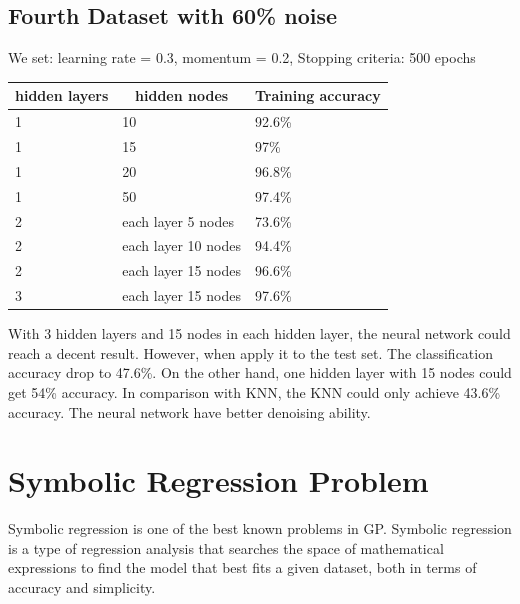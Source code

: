\documentclass[11pt, a4paper, oneside, openright]{article}
\begin{document}
\subsection{Fourth Dataset with 60\% noise}
We set:  learning rate = 0.3, momentum = 0.2, Stopping criteria: 500 epochs
\begin{table}[H]
\centering
\begin{tabular}{|l|l|l|}
\hline
\multicolumn{1}{|c|}{\textbf{hidden layers}} & \multicolumn{1}{c|}{\textbf{hidden nodes}} 
& \multicolumn{1}{c|}{\textbf{Training accuracy}}\\
\hline
1     &10 &92.6\%                                    \\
\hline
1    &15 &97\%                                  \\
\hline
1   &20 &96.8\%                                             \\
\hline
1   &50 &97.4\%                                             \\
\hline
2 &each layer 5 nodes  &73.6\%                                            \\
\hline
2  &each layer 10 nodes &94.4\%                                              \\
\hline
2  &each layer 15 nodes &96.6\%                                              \\
\hline
3 &each layer 15 nodes &97.6\%                                              \\
\hline
\end{tabular}
\end{table}

With 3 hidden layers and 15 nodes in each hidden layer, the neural network could reach a decent result. However, when apply it to the test set. The classification accuracy drop to 47.6\%. On the other hand, one hidden layer with 15 nodes could get 54\% accuracy. In comparison with KNN, the KNN could only achieve 43.6\% accuracy. The neural network have better denoising ability.

\section{Symbolic Regression Problem}
Symbolic regression is one of the best known problems in GP\cite{koza1992genetic}. Symbolic regression is a type of regression analysis that searches the space of mathematical expressions to find the model that best fits a given dataset, both in terms of accuracy and simplicity.
\end{document}
